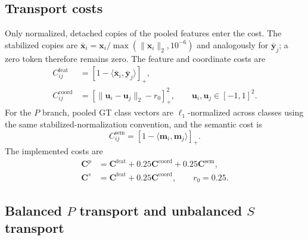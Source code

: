 \documentclass[10pt]{article}
\begin{document}
\subsection{Transport costs}

Only normalized, detached copies of the pooled features enter the cost.  The
stabilized copies are
$\bar{\bm{x}}_i=\bm{x}_i/\max(\|\bm{x}_i\|_2,10^{-6})$ and analogously for
$\bar{\bm{y}}_j$; a zero token therefore remains zero.  The feature and
coordinate costs are
\begin{align}
    C^{\mathrm{feat}}_{ij}
      &=\left[1-\langle\bar{\bm{x}}_i,
                             \bar{\bm{y}}_j\rangle\right]_+,\\
    C^{\mathrm{coord}}_{ij}
      &=\left[\|\bm{u}_i-\bm{u}_j\|_2-r_0\right]_+^2,
      \qquad \bm{u}_i,\bm{u}_j\in[-1,1]^2.
    \label{eq:feature-coordinate-cost}
\end{align}
For the $P$ branch, pooled GT class vectors are $\ell_1$-normalized across
classes using the same stabilized-normalization convention, and the semantic
cost is
\begin{equation}
    C^{\mathrm{sem}}_{ij}
      =\left[1-\langle\bm{m}_i,\bm{m}_j\rangle\right]_+.
\end{equation}
The implemented costs are
\begin{align}
    \bm{C}^p
      &=\bm{C}^{\mathrm{feat}}
        +0.25\bm{C}^{\mathrm{coord}}
        +0.25\bm{C}^{\mathrm{sem}},\\
    \bm{C}^s
      &=\bm{C}^{\mathrm{feat}}
        +0.25\bm{C}^{\mathrm{coord}},
    \qquad r_0=0.25.
    \label{eq:ot-costs}
\end{align}

\subsection{Balanced $P$ transport and unbalanced $S$ transport}
\end{document}
